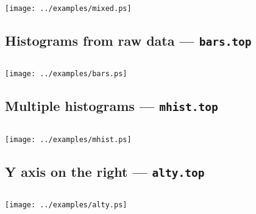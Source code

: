 \vspace{0.4cm}

\begin{verbatim}

\end{verbatim}

\vspace{0.4cm}
\texttt{[image: ../examples/mixed.ps]}

\newpage

\subsection{Histograms from raw data --- {\tt bars.top}}

\vspace{1cm}

\begin{verbatim}

\end{verbatim}

\vspace{1cm}
\texttt{[image: ../examples/bars.ps]}

\newpage

\subsection{Multiple histograms --- {\tt mhist.top}}

\vspace{0.4cm}

\begin{verbatim}

\end{verbatim}

\vspace{0.4cm}
\texttt{[image: ../examples/mhist.ps]}

\newpage

\subsection{Y axis on the right --- {\tt alty.top}}

\vspace{0.4cm}

\begin{verbatim}

\end{verbatim}

\vspace{0.4cm}
\texttt{[image: ../examples/alty.ps]}

